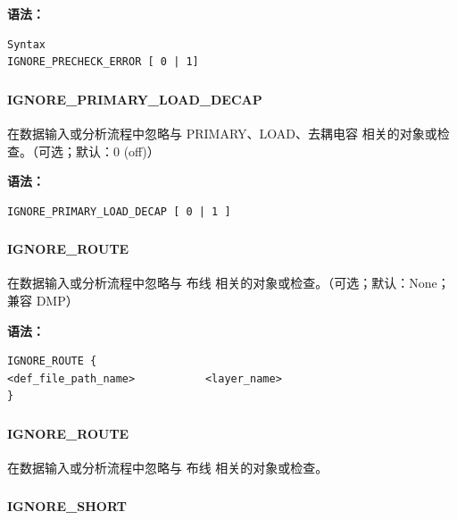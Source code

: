 \textbf{语法：}
\begin{lstlisting}
Syntax
IGNORE_PRECHECK_ERROR [ 0 | 1]
\end{lstlisting}

\subsubsection{}
\paragraph*{IGNORE_PRIMARY_LOAD_DECAP}

在数据输入或分析流程中忽略与 PRIMARY、LOAD、去耦电容 相关的对象或检查。（可选；默认：0 (off)）

\textbf{语法：}
\begin{lstlisting}
IGNORE_PRIMARY_LOAD_DECAP [ 0 | 1 ]
\end{lstlisting}

\subsubsection{}
\paragraph*{IGNORE_ROUTE}

在数据输入或分析流程中忽略与 布线 相关的对象或检查。（可选；默认：None；兼容 DMP）

\textbf{语法：}
\begin{lstlisting}
IGNORE_ROUTE {
<def_file_path_name>           <layer_name>
}
\end{lstlisting}

\subsubsection{}
\paragraph*{IGNORE_ROUTE}

在数据输入或分析流程中忽略与 布线 相关的对象或检查。

\subsubsection{}
\paragraph*{IGNORE_SHORT}

